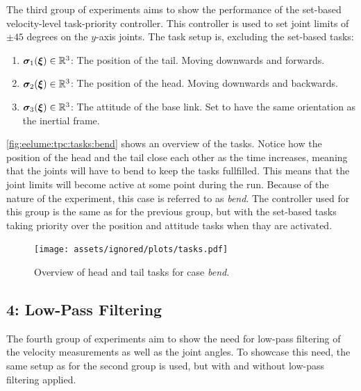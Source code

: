 The third group of experiments aims to show the performance of the set-based
velocity-level task-priority controller. This controller is used to set
joint limits of \(\pm 45\) degrees on the \(y\)-axis joints. The task setup is,
excluding the set-based tasks:
\begin{enumerate}
    \item \(\bm{\sigma}_1(\bm{\xi}) \in \mathbb{R}^3\): The position of the tail. Moving downwards and forwards.
    \item \(\bm{\sigma}_2(\bm{\xi}) \in \mathbb{R}^3\): The position of the head. Moving downwards and backwards.
    \item \(\bm{\sigma}_3(\bm{\xi}) \in \mathbb{R}^3\): The attitude of the base link. Set to have the same orientation as the inertial frame.
\end{enumerate}
\autoref{fig:eelume:tpc:tasks:bend} shows an overview of the tasks. Notice how
the position of the head and the tail close each other as the time increases, meaning
that the joints will have to bend to keep the tasks fullfilled. This means
that the joint limits will become active at some point during the run. Because
of the nature of the experiment, this case is referred to as \textit{bend}.
The controller
used for this group is the same as for the previous group, but with the set-based
tasks taking priority over the position and attitude tasks when thay are activated.

\begin{figure}[!ht]
    \centering
    \texttt{[image: assets/ignored/plots/tasks.pdf]}
    \caption{Overview of head and tail tasks for case \textit{bend}.}
    \label{fig:eelume:tpc:tasks:bend}
\end{figure}

\subsection*{4: Low-Pass Filtering}

The fourth group of experiments aim to show the need for low-pass filtering of the velocity measurements as well as the joint angles. To showcase this need, the same
setup as for the second group is used, but with and without low-pass filtering
applied. 

\fi








